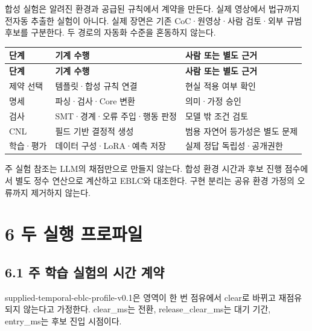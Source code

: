 \documentclass[11pt,a4paper]{article}
\begin{document}
합성 실험은 알려진 환경과 공급된 규칙에서 계약을 만든다. 실제 영상에서 법규까지 전자동 추출한 실험이 아니다. 실제 장면은 기존 CoC·원영상·사람 검토·외부 규범 후보를 구분한다. 두 경로의 자동화 수준을 혼동하지 않는다.\par

\begingroup\small
\begin{longtable}{@{}>{\raggedright\arraybackslash}p{}>{\raggedright\arraybackslash}p{}>{\raggedright\arraybackslash}p{}@{}}
\toprule
\textbf{단계} & \textbf{기계 수행} & \textbf{사람 또는 별도 근거} \\
\midrule\endfirsthead
\toprule
\textbf{단계} & \textbf{기계 수행} & \textbf{사람 또는 별도 근거} \\
\midrule\endhead
\bottomrule\endfoot
제약 선택 & 템플릿·합성 규칙 연결 & 현실 적용 여부 확인 \\
명세 & 파싱·검사·Core 변환 & 의미·가정 승인 \\
검사 & SMT·경계·오류 주입·행동 판정 & 모델 밖 조건 검토 \\
CNL & 필드 기반 결정적 생성 & 범용 자연어 등가성은 별도 문제 \\
학습·평가 & 데이터 구성·LoRA·예측 저장 & 실제 정답 독립성·공개권한 \\
\end{longtable}
\endgroup

주 실험 참조는 LLM의 채점만으로 만들지 않는다. 합성 환경 시간과 후보 진행 점수에서 별도 정수 연산으로 계산하고 EBLC와 대조한다. 구현 분리는 공유 환경 가정의 오류까지 제거하지 않는다.\par

\clearpage{}\section*{6 두 실행 프로파일}

\subsection*{6.1 주 학습 실험의 시간 계약}

{\ttfamily\small supplied-temporal-eblc-profile-v0.1}은 영역이 한 번 점유에서 clear로 바뀌고 재점유되지 않는다고 가정한다. clear\_\allowbreak{}ms는 전환, release\_\allowbreak{}clear\_\allowbreak{}ms는 대기 기간, entry\_\allowbreak{}ms는 후보 진입 시점이다.\par
\end{document}
